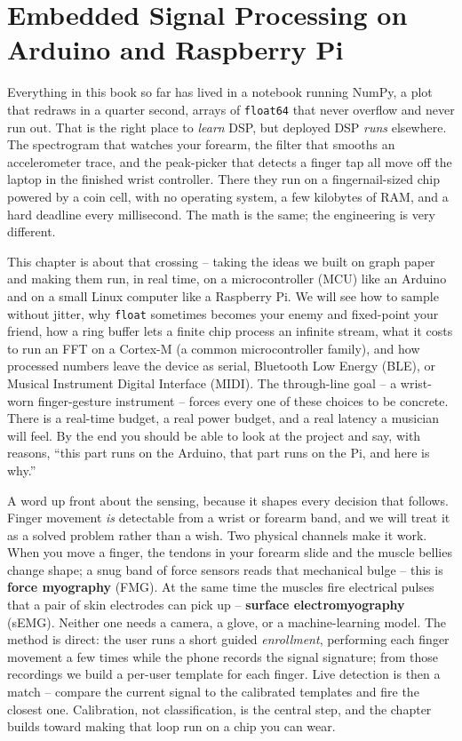 \chapter{Embedded Signal Processing on Arduino and Raspberry Pi}

\chapterline

Everything in this book so far has lived in a notebook running NumPy, a
plot that redraws in a quarter second, arrays of \texttt{float64} that never overflow and never
run out. That is the right place to \emph{learn} DSP, but deployed DSP \emph{runs} elsewhere. The
spectrogram that watches your forearm, the filter that smooths an accelerometer trace, and the
peak-picker that detects a finger tap all move off the laptop in the finished wrist controller. There they run on a
fingernail-sized chip powered by a coin cell, with no operating system, a few kilobytes
of RAM, and a hard deadline every millisecond. The math is
the same; the engineering is very different.

This chapter is about that crossing -- taking the ideas we built on graph paper and making them
run, in real time, on a microcontroller (MCU) like an Arduino and on a small Linux computer like
a Raspberry Pi. We will see how to sample without jitter, why \texttt{float} sometimes becomes
your enemy and fixed-point your friend, how a ring buffer lets a finite chip process an infinite
stream, what it costs to run an FFT on a Cortex-M (a common microcontroller family), and how processed numbers leave the
device as serial, Bluetooth Low Energy (BLE), or Musical Instrument Digital Interface (MIDI). The through-line goal -- a wrist-worn finger-gesture instrument --
forces every one of these choices to be concrete. There is a real-time budget, a real power budget,
and a real latency a musician will feel. By the end you should be able to look at the project and
say, with reasons, ``this part runs on the Arduino, that part runs on the Pi, and here is why.''

A word up front about the sensing, because it shapes every decision that follows. Finger movement
\emph{is} detectable from a wrist or forearm band, and we will treat it as a solved problem rather
than a wish. Two physical channels make it work. When you move a finger, the tendons in your
forearm slide and the muscle bellies change shape; a snug band of force sensors reads that
mechanical bulge -- this is \textbf{force myography} (FMG). At the same time the muscles fire
electrical pulses that a pair of skin electrodes can pick up -- \textbf{surface electromyography}
(sEMG). Neither one needs a camera, a glove, or a machine-learning model. The method is direct: the
user runs a short guided \emph{enrollment}, performing each finger movement a few times while the
phone records the signal signature; from those recordings we build a per-user template for each
finger. Live detection is then a match -- compare the current signal to the calibrated templates
and fire the closest one. Calibration, not classification, is the central step, and the
chapter builds toward making that loop run on a chip you can wear.

